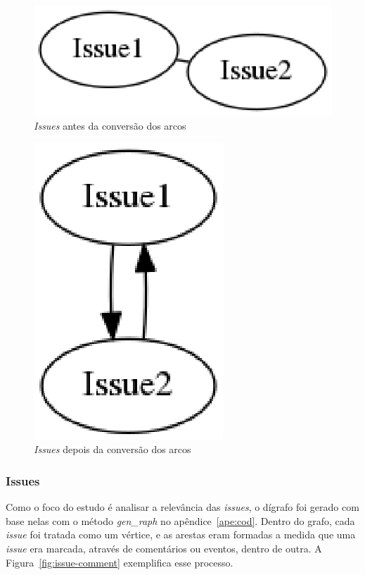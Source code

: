 \begin{figure}[!h]
    \centering
        \includegraphics[keepaspectratio=true,scale=0.5]{figuras/undirected.eps}
    \caption{\textit{Issues} antes da conversão dos arcos}
    \label{fig:undirected}
\end{figure}

\begin{figure}[!h]
    \centering
        \includegraphics[keepaspectratio=true,scale=0.5]{figuras/directed.eps}
    \caption{\textit{Issues} depois da conversão dos arcos}
    \label{fig:directed}
\end{figure}

\subsubsection{Issues}
\label{est:ran:iss}

Como o foco do estudo é analisar a relevância das \textit{issues}, o dígrafo foi gerado com base nelas com o método \textit{gen\_raph} no apêndice~\ref{ape:cod}. Dentro do grafo, cada \textit{issue} foi tratada como um vértice, e as arestas eram formadas a medida que uma \textit{issue} era marcada, através de comentários ou eventos, dentro de outra. A Figura~\ref{fig:issue-comment} exemplifica esse processo.

